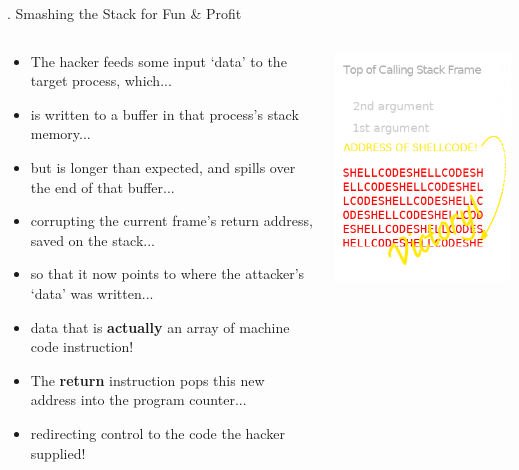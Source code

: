 \documentclass[9pt]{beamer}
\begin{document}
\begin{frame}{\theframenumber. Smashing the Stack for Fun \& Profit}
  \begin{columns}
    \begin{column}{.5\textwidth}
      \small
      \begin{itemize}
      \item The hacker feeds some input `data' to the target process, which...
      \item is written to a buffer in that process's stack memory...
      \item but is longer than expected, and spills over the end of that buffer...
      \item corrupting the current frame's return address, saved on the stack...
      \item so that it now points to where the attacker's `data' was written...
      \item data that is \textbf{actually} an array of machine code instruction!
      \item The \textbf{return} instruction pops this new address into the program counter...
      \item<+-> redirecting control to the code the hacker supplied!
      \end{itemize}
    \end{column}
    \begin{column}{.5\textwidth}
      \includegraphics[width=\textwidth]{../images/stack_frame_attack.png}

\end{column}
\end{columns}
\end{frame}
\end{document}

